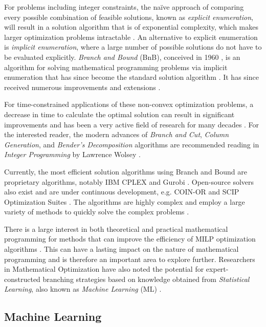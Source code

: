 For problems including integer constraints, the na\"ive approach of comparing every possible combination of feasible solutions, known as \textit{explicit enumeration}, will result in a solution algorithm that is of exponential complexity, which makes larger optimization problems intractable \cite{wolsey2020integer}. An alternative to explicit enumeration is \textit{implicit enumeration}, where a large number of possible solutions do not have to be evaluated explicitly. 
\textit{Branch and Bound} (\gls{BnB}), conceived in 1960 \cite{land1960automatic}, is an algorithm for solving mathematical programming problems via implicit enumeration that has since become the standard solution algorithm \cite{wolsey2020integer}. It has since received numerous improvements and extensions \cite{wolsey2020integer}. 

For time-constrained applications of these non-convex optimization problems, a decrease in time to calculate the optimal solution can result in significant improvements and has been a very active field of research for many decades \cite{wolsey2020integer}. For the interested reader, the modern advances of \textit{Branch and Cut}, \textit{Column Generation}, and \textit{Bender's Decomposition} algorithms are recommended reading in \textit{Integer Programming} by Lawrence Wolsey \cite{wolsey2020integer}.

Currently, the most efficient solution algorithms using Branch and Bound are proprietary algorithms, notably IBM CPLEX and Gurobi \cite{anand2017comparative}. Open-source solvers also exist and are under continuous development, e.g. \gls{COIN-OR} and \gls{SCIP} Optimization Suites \cite{achterberg2009scip,anand2017comparative}. The algorithms are highly complex and employ a large variety of methods to quickly solve the complex problems \cite{wolsey2020integer}. 

There is a large interest in both theoretical and practical mathematical programming for methods that can improve the efficiency of \gls{MILP} optimization algorithms \cite{wolsey2020integer}. This can have a lasting impact on the nature of mathematical programming and is therefore an important area to explore further. Researchers in Mathematical Optimization have also noted the potential for expert-constructed branching strategies based on knowledge obtained from \textit{Statistical Learning}, also known as \textit{Machine Learning} (\Gls{ML}) \cite{lodi2017learning}.




\subsection{Machine Learning}

